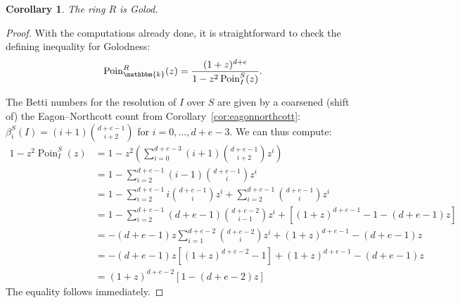 \documentclass[12pt,reqno]{amsart}
\newtheorem{corollary}[theorem]{Corollary}
\theoremstyle{definition}
\theoremstyle{remark}
\newcommand{\Poin}{\operatorname{Poin}}
\newcommand{\bbk}{\mathbbm{k}}
\begin{document}
\begin{corollary}
\label{cor:Golod}
The ring $R$ is Golod.
\end{corollary}

\begin{proof}
With the computations already done, it is straightforward to check the defining inequality for Golodness: 
\[
\Poin_\bbk^R(z) = 
\frac{(1+z)^{d+e}}{1-z^2 \Poin^S_I(z)}.
\]

The Betti numbers for the resolution of $I$ over $S$ are given by a coarsened (shift of) the Eagon--Northcott count from Corollary~\ref{cor:eagonnorthcott}: $\beta_i^S(I) = (i+1) \binom{d+e-1}{i+2}$ for $i=0,\ldots, d+e-3$. We can thus compute:
\[
\begin{array}{ll}
1-z^2 \Poin^S_I(z) &= 1 - z^2 \left( \sum\limits_{i=0}^{d+e-3} (i+1) \binom{d+e-1}{i+2} z^i \right) \\
&= 1 - \sum\limits_{i=2}^{d+e-1} (i-1) \binom{d+e-1}{i} z^i \\ 
&= 1 - \sum\limits_{i=2}^{d+e-1}i \binom{d+e-1}{i} z^i + \sum\limits_{i=2}^{d+e-1} \binom{d+e-1}{i} z^i \\ 
&= 1 - \sum\limits_{i=2}^{d+e-1} (d+e-1) \binom{d+e-2}{i-1} z^i + \left[(1+z)^{d+e-1} - 1 - (d+e-1)z\right] \\ 
&= -(d+e-1)z \sum\limits_{i=1}^{d+e-2} \binom{d+e-2}{i} z^i + (1+z)^{d+e-1} - (d+e-1)z \\ 
&= -(d+e-1)z[(1+z)^{d+e-2}-1] + (1+z)^{d+e-1} - (d+e-1)z \\
&= (1+z)^{d+e-2}[1-(d+e-2)z]
\end{array}
\]
The equality follows immediately.
\end{proof}



\end{document}
